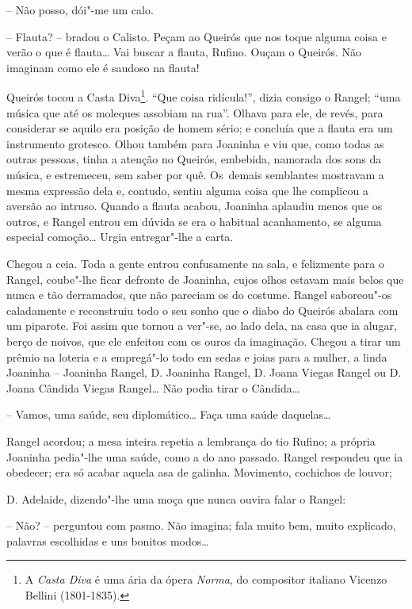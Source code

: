 -- Não posso, dói"-me um calo.

-- Flauta? -- bradou o Calisto. Peçam ao Queirós que nos toque alguma
coisa e verão o que é flauta\ldots{} Vai buscar a flauta, Rufino. Ouçam o
Queirós. Não imaginam como ele é saudoso na flauta!

Queirós tocou a Casta Diva\footnote{A \emph{Casta Diva} é uma ária da
  ópera \emph{Norma}, do compositor italiano Vicenzo Bellini
  (1801-1835).}. ``Que coisa ridícula!'', dizia consigo o Rangel; ``uma
música que até os moleques assobiam na rua''. Olhava para ele, de revés,
para considerar se aquilo era posição de homem sério; e concluía que a
flauta era um instrumento grotesco. Olhou também para Joaninha e viu
que, como todas as outras pessoas, tinha a atenção no Queirós, embebida,
namorada dos sons da música, e estremeceu, sem saber por quê. Os~demais
semblantes mostravam a mesma expressão dela e, contudo, sentiu alguma
coisa que lhe complicou a aversão ao intruso. Quando a flauta acabou,
Joaninha aplaudiu menos que os outros, e Rangel entrou em dúvida se era
o habitual acanhamento, se alguma especial comoção\ldots{} Urgia entregar"-lhe
a carta.

Chegou a ceia. Toda a gente entrou confusamente na sala, e felizmente
para o Rangel, coube"-lhe ficar defronte de Joaninha, cujos olhos estavam
mais belos que nunca e tão derramados, que não pareciam os do costume.
Rangel saboreou"-os caladamente e reconstruiu todo o seu sonho que o
diabo do Queirós abalara com um piparote. Foi assim que tornou a ver"-se,
ao lado dela, na casa que ia alugar, berço de noivos, que ele enfeitou
com os ouros da imaginação. Chegou a tirar um prêmio na loteria e a
empregá"-lo todo em sedas e joias para a mulher, a linda Joaninha --
Joaninha Rangel, D. Joaninha Rangel, D. Joana Viegas Rangel ou D. Joana
Cândida Viegas Rangel\ldots{} Não podia tirar o Cândida\ldots{}

-- Vamos, uma saúde, seu diplomático\ldots{} Faça uma saúde daquelas\ldots{}

Rangel acordou; a mesa inteira repetia a lembrança do tio Rufino; a
própria Joaninha pedia"-lhe uma saúde, como a do ano passado. Rangel
respondeu que ia obedecer; era só acabar aquela asa de galinha.
Movimento, cochichos de louvor;

D. Adelaide, dizendo"-lhe uma moça que nunca ouvira falar o Rangel:

-- Não? -- perguntou com pasmo. Não imagina; fala muito bem, muito
explicado, palavras escolhidas e uns bonitos modos\ldots{}

